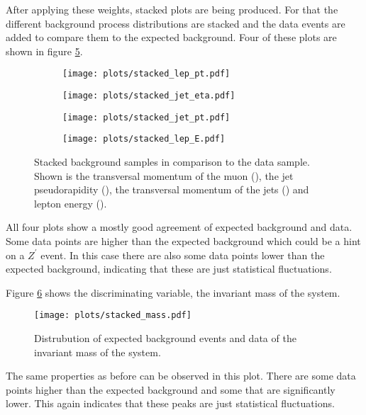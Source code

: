 After applying these weights, stacked plots are being produced.
For that the different background process distributions are stacked and the data events are added to compare them to the expected background. Four of these plots are shown in figure \ref{fig:stack}.


\begin{figure}[H]
  \begin{subfigure}{0.5\textwidth}
    \centering
    \texttt{[image: plots/stacked\_lep\_pt.pdf]}
    \caption{}
    \label{fig:stacked_lep_pt}
  \end{subfigure}%
  \begin{subfigure}{0.5\textwidth}
    \centering
    \texttt{[image: plots/stacked\_jet\_eta.pdf]}
    \caption{}
    \label{fig:stacked_jet_eta}
  \end{subfigure}%
  \newline
  \begin{subfigure}{0.5\textwidth}
    \centering
    \texttt{[image: plots/stacked\_jet\_pt.pdf]}
    \caption{}
    \label{fig:stacked_jet_pt}
  \end{subfigure}%
  \begin{subfigure}{0.5\textwidth}
    \centering
    \texttt{[image: plots/stacked\_lep\_E.pdf]}
    \caption{}
    \label{fig:stacked_lep_E}
  \end{subfigure}%
  \caption{Stacked background samples in comparison to the data sample.
Shown is the transversal momentum of the muon (), the jet pseudorapidity (),
  the transversal momentum of the jets () and lepton energy ().
  }
  \label{fig:stack}
\end{figure}

All four plots show a mostly good agreement of expected background and data.
Some data points are higher than the expected background which could be a hint on a $Z^\prime$ event.
In this case there are also some data points lower than the expected background, indicating that these are just statistical fluctuations.

Figure \ref{fig:disc} shows the discriminating variable, the invariant mass of the system.
\begin{figure}[H]
    \centering
    \texttt{[image: plots/stacked\_mass.pdf]}
    \caption{Distrubution of expected background events and data of the invariant mass of the system.}
    \label{fig:disc}
\end{figure}

The same properties as before can be observed in this plot. There are some data points higher than the expected background and some that are significantly lower.
This again indicates that these peaks are just statistical fluctuations.
